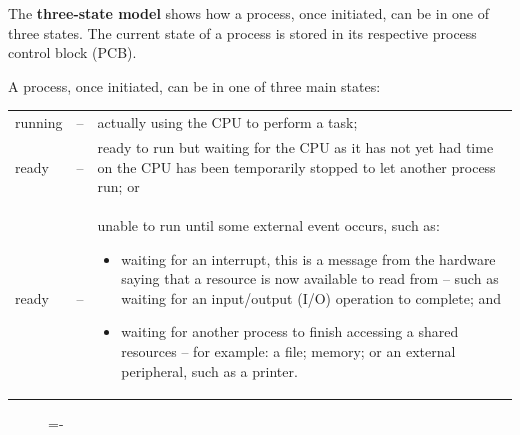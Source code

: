\documentclass[a4paper]{systems-software}
\begin{document}
The \textbf{three-state model} shows how a process, once initiated, can be in one of three states. The current state of a process is stored in its respective process control block (PCB).

A process, once initiated, can be in one of three main states:
\begin{longtabu} to \textwidth {X[2,l] X[1,c] X[10,l]}
	\textbullet running & -- & actually using the CPU to perform a task;
	\\
	\textbullet ready & -- & ready to run but waiting for the CPU as it has not yet had time on the CPU has been temporarily stopped to let another process run; or
	\\
	\textbullet ready & -- & unable to run until some external event occurs, such as:
		\begin{itemize}
			\item waiting for an interrupt, this is a message from the hardware saying that a resource is now available to read from – such as waiting for an input/output (I/O) operation to complete; and
			\item waiting for another process to finish accessing a shared resources – for example: a file; memory; or an external peripheral, such as a printer.
		\end{itemize}
\end{longtabu}

\begin{figure}[H]
  \lineskip=-\fboxrule
\end{figure}
\end{document}
